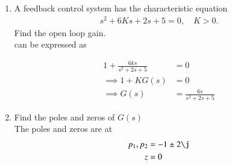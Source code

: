 \begin{enumerate}[label=\thesubsection.\arabic*.,ref=\thesubsection.\theenumi]
\item A feedback control system has the characteristic equation 
\begin{align}
    s^2 + 6Ks + 2s + 5 = 0, \quad K > 0. 
\label{eq:ee18btech11046_char}
\end{align}
%
Find the open loop gain.
\\
\solution     \label{eq:ee18btech11046_char} can be expressed as

\begin{align}
    1+\frac{6 k s}{s^{2}+2 s+5}&=0    
\\
\implies 1+KG(s)&=0
\\
\implies G(s) &= \frac{6 s}{s^{2}+2 s+5}
\label{eq:ee18btech11046_gs}
\end{align}

\item Find the poles and zeros of $G(s)$
\\
\solution The poles and zeros  are at 
\begin{align}
\begin{split}
p_1,p_2 &= -1 \pm 2\j
\\
z &=0
\end{split}
\label{eq:ee18btech11046_pz}
\end{align}


\end{enumerate}
